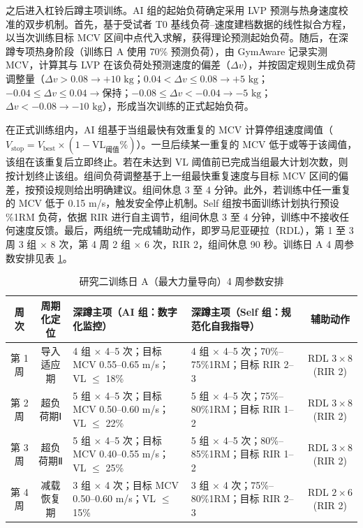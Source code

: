 \documentclass[UTF8,zihao=-4,twoside,openany]{ctexbook}
\begin{document}
之后进入杠铃后蹲主项训练。AI 组的起始负荷确定采用 LVP 预测与热身速度校准的双步机制。首先，基于受试者 T0 基线负荷--速度建档数据的线性拟合方程，以当次训练目标 MCV 区间中点代入求解，获得理论预测起始负荷。随后，在深蹲专项热身阶段（训练日 A 使用 70\% 预测负荷），由 GymAware 记录实测 MCV，计算其与 LVP 在该负荷处预测速度的偏差（$\Delta v$），并按固定规则生成负荷调整量（$\Delta v > 0.08 \rightarrow +10\text{ kg}$；$0.04 < \Delta v \le 0.08 \rightarrow +5\text{ kg}$；$-0.04 \le \Delta v \le 0.04 \rightarrow \text{保持}$；$-0.08 \le \Delta v < -0.04 \rightarrow -5\text{ kg}$；$\Delta v < -0.08 \rightarrow -10\text{ kg}$），形成当次训练的正式起始负荷。

在正式训练组内，AI 组基于当组最快有效重复的 MCV 计算停组速度阈值（$V_{\text{stop}} = V_{\text{best}} \times (1 - \text{VL}_{\text{阈值}}\%)$）。一旦后续某一重复的 MCV 低于或等于该阈值，该组在该重复后立即终止。若在未达到 VL 阈值前已完成当组最大计划次数，则按计划终止该组。组间负荷调整基于上一组最快重复速度与目标 MCV 区间的偏差，按预设规则给出明确建议。组间休息 3 至 4 分钟。此外，若训练中任一重复的 MCV 低于 0.15 m/s，触发安全停止机制。Self 组按书面训练计划执行预设 \%1RM 负荷，依据 RIR 进行自主调节，组间休息 3 至 4 分钟，训练中不接收任何速度反馈。最后，两组统一完成辅助动作，即罗马尼亚硬拉（RDL），第 1 至 3 周 3 组 $\times$ 8 次，第 4 周 2 组 $\times$ 6 次，RIR 2，组间休息 90 秒。训练日 A 4 周参数安排见表 \ref{tab:ch3-trainA}。

\begin{table}[htbp]
  \centering
  \caption{研究二训练日 A（最大力量导向）4 周参数安排}
  \label{tab:ch3-trainA}
  \vspace{6pt}
  \small
  \begin{tabularx}{\textwidth}{|c|c|X|X|c|}
    \hline
    \textbf{周次} & \textbf{周期化定位} & \textbf{深蹲主项（AI 组：数字化监控）} & \textbf{深蹲主项（Self 组：规范化自我指导）} & \textbf{辅助动作} \\ \hline
    第 1 周 & 导入适应期 & 4 组 $\times$ 4--5 次；目标 MCV 0.55--0.65 m/s；VL $\le$ 18\% & 4 组 $\times$ 4--5 次；70\%--75\%1RM；目标 RIR 2--3 & RDL $3\times 8$ (RIR 2) \\ \hline
    第 2 周 & 超负荷期Ⅰ & 5 组 $\times$ 4--5 次；目标 MCV 0.50--0.60 m/s；VL $\le$ 22\% & 5 组 $\times$ 4--5 次；75\%--80\%1RM；目标 RIR 1--2 & RDL $3\times 8$ (RIR 2) \\ \hline
    第 3 周 & 超负荷期Ⅱ & 5 组 $\times$ 4--5 次；目标 MCV 0.40--0.55 m/s；VL $\le$ 25\% & 5 组 $\times$ 4--5 次；80\%--85\%1RM；目标 RIR 1--2 & RDL $3\times 8$ (RIR 2) \\ \hline
    第 4 周 & 减载恢复期 & 3 组 $\times$ 4 次；目标 MCV 0.50--0.60 m/s；VL $\le$ 15\% & 3 组 $\times$ 4 次；75\%--80\%1RM；目标 RIR 2--3 & RDL $2\times 6$ (RIR 2) \\ \hline
  \end{tabularx}
\end{table}
\end{document}
